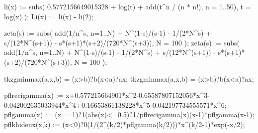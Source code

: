 \xintdeffloatfunc li(x) :=
  subs(
    0.5772156649015328 + log(t) + add(t^n / (n * n!), n = 1..50),
    t = log(x)
  );
\xintdeffloatfunc Li(x) := li(x) - li(2);

\xintdeffloatfunc zeta(s) :=
  subs(
    add(1/n^s, n=1..N)
    + N^(1-s)/(s-1)
    - 1/(2*N^s)
    + s/(12*N^(s+1))
    - s*(s+1)*(s+2)/(720*N^(s+3)),
    N = 100
  );
\xintdeffunc zeta(s) :=
  subs(
    add(1/n^s, n=1..N)
    + N^(1-s)/(s-1)
    - 1/(2*N^s)
    + s/(12*N^(s+1))
    - s*(s+1)*(s+2)/(720*N^(s+3)),
    N = 100
  );
  
\xintdeffloatfunc tkzgminmax(a,x,b) = (x>b)?{b}{(x<a)?{a}{x}};
\xintdeffunc tkzgminmax(a,x,b) = (x>b)?{b}{(x<a)?{a}{x}};

\xintdeffloatfunc pflrecigamma(x) := x+0.577215664901*x^2-0.65587807152056*x^3-0.042002635033944*x^4+0.16653861138228*x^5-0.042197734555571*x^6;
\xintdeffloatfunc pflgamma(x) := (x==1)?{1}{(abs(x)<=0.5)?{1/pflrecigamma(x)}{(x-1)*pflgamma(x-1)}};
\xintdeffloatfunc pflkhideux(x,k) := (x<0)?{0}{(1/(2^(k/2)*pflgamma(k/2)))*x^(k/2-1)*exp(-x/2)};

\NewDocumentCommand{}

\NewDocumentCommand{}

\NewDocumentCommand{}

\NewDocumentCommand{}

\NewDocumentCommand{}


